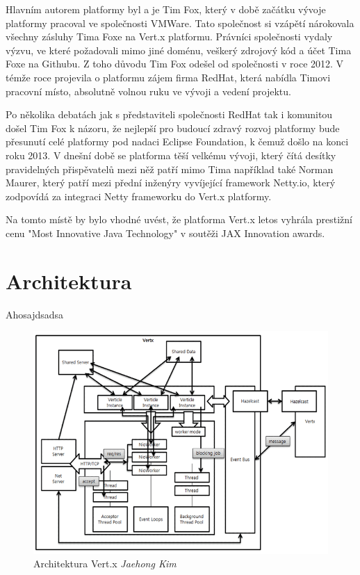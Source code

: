 Hlavním autorem platformy byl a je Tim Fox, který v době začátku vývoje platformy pracoval ve společnosti VMWare. Tato společnost si vzápětí nárokovala všechny zásluhy Tima Foxe na Vert.x platformu. Právníci společnosti vydaly výzvu, ve které požadovali mimo jiné doménu, veškerý zdrojový kód a účet Tima Foxe na Githubu. Z toho důvodu Tim Fox odešel od společnosti v roce 2012. V témže roce projevila o platformu zájem firma RedHat, která nabídla Timovi pracovní místo, absolutně volnou ruku ve vývoji a vedení projektu\citep{whoControlVertx}. 

Po několika debatách jak s představiteli společnosti RedHat tak i komunitou došel Tim Fox k názoru, že nejlepší pro budoucí zdravý rozvoj platformy bude přesunutí celé platformy pod nadaci Eclipse Foundation, k čemuž došlo na konci roku 2013. V dnešní době se platforma těší velkému vývoji, který čítá desítky  pravidelných přispěvatelů mezi něž patří mimo Tima například také Norman Maurer, který patří mezi přední inženýry vyvíjející framework Netty.io, který zodpovídá za integraci Netty frameworku do Vert.x platformy. 

Na tomto místě by bylo vhodné uvést, že platforma Vert.x letos vyhrála prestižní cenu "Most Innovative Java Technology" v soutěži JAX Innovation awards\citep{JAX}.

\section{Architektura}

Ahosajdsadsa

\begin{figure}
\begin{centering}
\includegraphics[width	=1\textwidth]{obrazky/vertx-architecture-diagram}
\par\end{centering}
\caption{Architektura Vert.x \emph{Jaehong Kim} \label{fig:vertxArchitectureDiagram}}
\end{figure}

